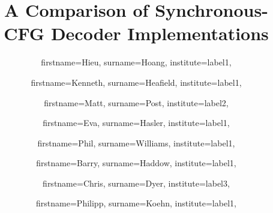 \documentclass{pbml}
\begin{document}

\title{A Comparison of Synchronous-CFG \titlelinebreak{} Decoder Implementations}




\author{
  firstname=Hieu,
  surname=Hoang,
  institute=label1,
}
\author{
  firstname=Kenneth,
  surname=Heafield,
  institute=label1,
}
\author{
  firstname=Matt,
  surname=Post,
  institute=label2,
}
\author{
  firstname=Eva,
  surname=Hasler,
  institute=label1,
}
\author{
  firstname=Phil,
  surname=Williams,
  institute=label1,
}
\author{
  firstname=Barry,
  surname=Haddow,
  institute=label1,
}
\author{
  firstname=Chris,
  surname=Dyer,
  institute=label3,
}
\author{
  firstname=Philipp,
  surname=Koehn,
  institute=label1,
}

\end{document}

